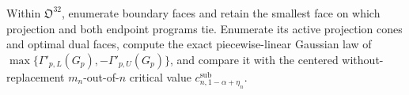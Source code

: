 Within \(\mathfrak O^{32}\), enumerate boundary faces and retain the smallest face on which projection and both endpoint programs tie. Enumerate its active projection cones and optimal dual faces, compute the exact piecewise-linear Gaussian law of \(\max\{\Gamma'_{p,L}(G_p),-\Gamma'_{p,U}(G_p)\}\), and compare it with the centered without-replacement \(m_n\)-out-of-\(n\) critical value \(c^{\mathrm{sub}}_{n,1-\alpha+\eta_n}\).